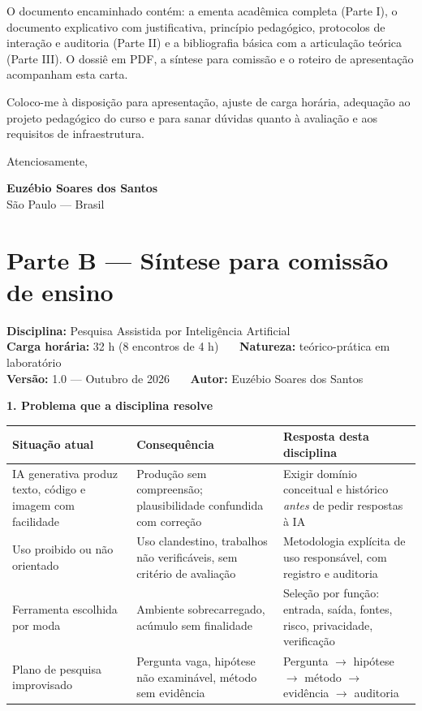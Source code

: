 \documentclass[11pt,a4paper]{article}
\newcommand{\sub}[1]{{\bfseries #1}\par\smallskip}
\begin{document}
O documento encaminhado contém: a ementa acadêmica completa (Parte I), o documento
explicativo com justificativa, princípio pedagógico, protocolos de interação e auditoria
(Parte II) e a bibliografia básica com a articulação teórica (Parte III). O dossiê em PDF, a
síntese para comissão e o roteiro de apresentação acompanham esta carta.

Coloco-me à disposição para apresentação, ajuste de carga horária, adequação ao projeto
pedagógico do curso e para sanar dúvidas quanto à avaliação e aos requisitos de
infraestrutura.

Atenciosamente,

\textbf{Euzébio Soares dos Santos}\\
São Paulo --- Brasil

\newpage

\section*{Parte B --- Síntese para comissão de ensino}

{\small
\textbf{Disciplina:} Pesquisa Assistida por Inteligência Artificial\\
\textbf{Carga horária:} 32 h (8 encontros de 4 h) \ \textbar\ \ \textbf{Natureza:} teórico-prática em laboratório\\
\textbf{Versão:} 1.0 --- Outubro de 2026 \ \textbar\ \ \textbf{Autor:} Euzébio Soares dos Santos
}\par\bigskip

\sub{1. Problema que a disciplina resolve}

{\small
\begin{tabular}{|p{}|p{}|p{}|}
\hline
\textbf{Situação atual} & \textbf{Consequência} & \textbf{Resposta desta disciplina} \\
\hline
IA generativa produz texto, código e imagem com facilidade & Produção sem compreensão; plausibilidade confundida com correção & Exigir domínio conceitual e histórico \emph{antes} de pedir respostas à IA \\
\hline
Uso proibido ou não orientado & Uso clandestino, trabalhos não verificáveis, sem critério de avaliação & Metodologia explícita de uso responsável, com registro e auditoria \\
\hline
Ferramenta escolhida por moda & Ambiente sobrecarregado, acúmulo sem finalidade & Seleção por função: entrada, saída, fontes, risco, privacidade, verificação \\
\hline
Plano de pesquisa improvisado & Pergunta vaga, hipótese não examinável, método sem evidência & Pergunta $\rightarrow$ hipótese $\rightarrow$ método $\rightarrow$ evidência $\rightarrow$ auditoria \\
\hline
\end{tabular}
}
\end{document}
